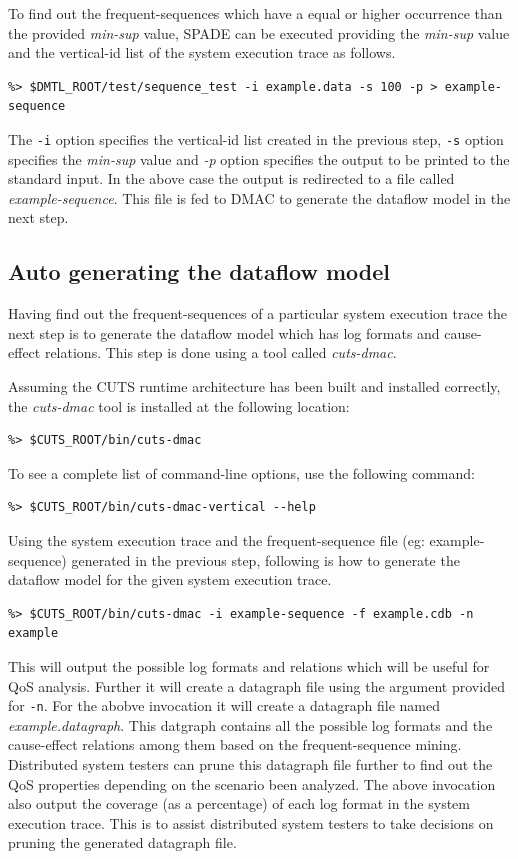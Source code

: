 To find out the frequent-sequences which have a equal or 
higher occurrence than the provided \textit{min-sup} value, 
SPADE can be executed providing the \textit{min-sup} value and the vertical-id 
list of the system execution trace as follows.
\begin{lstlisting}
%> $DMTL_ROOT/test/sequence_test -i example.data -s 100 -p > example-sequence
\end{lstlisting}

The \texttt{-i} option specifies the vertical-id list created in the previous step, 
\texttt{-s} option specifies the \textit{min-sup} value and \textit{-p} option 
specifies the output to be printed to the standard input. In the above case 
the output is redirected to a file called \textit{example-sequence}. This file 
is fed to DMAC to generate the dataflow model in the next step.

\subsection{Auto generating the dataflow model}
\label{sec:auto-generating}

Having find out the frequent-sequences of a particular system 
execution trace the next step is to generate the dataflow model which 
has log formats and cause-effect relations. This step is done using a tool called 
\textit{cuts-dmac}.

Assuming the CUTS runtime architecture has been built 
and installed correctly, the \textit{cuts-dmac} tool is installed at the 
following location:
\begin{lstlisting}
%> $CUTS_ROOT/bin/cuts-dmac
\end{lstlisting}
To see a complete list of command-line options, use the following 
command:
\begin{lstlisting}
%> $CUTS_ROOT/bin/cuts-dmac-vertical --help
\end{lstlisting}

Using the system execution trace and the frequent-sequence 
file (eg: example-sequence) generated in the previous step, following 
is how to generate the dataflow model for the given system execution 
trace.

\begin{lstlisting}
%> $CUTS_ROOT/bin/cuts-dmac -i example-sequence -f example.cdb -n example
\end{lstlisting}

This will output the possible log formats and relations which will be useful for 
QoS analysis. Further it will create a datagraph file using the argument 
provided for \texttt{-n}. For the abobve invocation it will create a datagraph 
file named \textit{example.datagraph}. This datgraph contains all the 
possible log formats and the cause-effect relations among them based on 
the frequent-sequence mining. Distributed system testers can prune this 
datagraph file further to find out the QoS 
properties depending on the scenario been analyzed. The above invocation 
also output the coverage (as a percentage) of each log format in the system 
execution trace. This is to assist distributed system testers to take decisions 
on pruning the generated datagraph file.